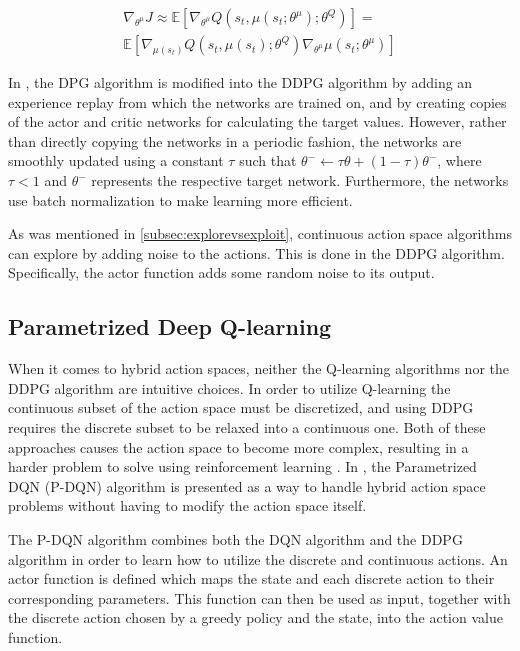 \documentclass{kththesis}
\begin{document}
\begin{equation}
\label{eq:policygradient}
\begin{split}
\nabla_{\theta^\mu}J \approx \mathbb{E}[\nabla_{\theta^\mu}Q(s_t, \mu(s_t;\theta^\mu); \theta^Q)] = \\ \mathbb{E}[\nabla_{\mu(s_t)}Q(s_t, \mu(s_t); \theta^Q)\nabla_{\theta^\mu}\mu(s_t; \theta^\mu)]
\end{split}
\end{equation}

In \textcite{lillicrap2015continuous}, the DPG algorithm is modified into the DDPG algorithm by adding an experience replay from which the networks are trained on, and by creating copies of the actor and critic networks for calculating the target values. However, rather than directly copying the networks in a periodic fashion, the networks are smoothly updated using a constant $\tau$ such that $\theta^- \leftarrow \tau\theta + (1-\tau)\theta^-$, where $\tau < 1$ and $\theta^-$ represents the respective target network. Furthermore, the networks use batch normalization to make learning more efficient. 

As was mentioned in \autoref{subsec:explorevsexploit}, continuous action space algorithms can explore by adding noise to the actions. This is done in the DDPG algorithm. Specifically, the actor function adds some random noise to its output. \parencite{lillicrap2015continuous}

\subsection{Parametrized Deep Q-learning}
When it comes to hybrid action spaces, neither the Q-learning algorithms nor the DDPG algorithm are intuitive choices. In order to utilize Q-learning the continuous subset of the action space must be discretized, and using DDPG requires the discrete subset to be relaxed into a continuous one. Both of these approaches causes the action space to become more complex, resulting in a harder problem to solve using reinforcement learning \parencite{xiong2018parametrized}. In \textcite{xiong2018parametrized}, the Parametrized DQN (P-DQN) algorithm is presented as a way to handle hybrid action space problems without having to modify the action space itself.

The P-DQN algorithm combines both the DQN algorithm and the DDPG algorithm in order to learn how to utilize the discrete and continuous actions. An actor function is defined which maps the state and each discrete action to their corresponding parameters. This function can then be used as input, together with the discrete action chosen by a greedy policy and the state, into the action value function. 
\end{document}

